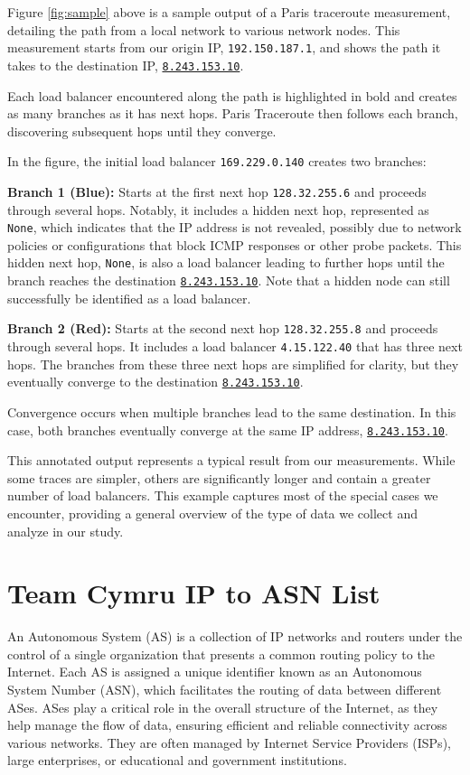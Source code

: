 \documentclass[12pt]{cwru_thesis}
\begin{document}
Figure \ref{fig:sample} above is a sample output of a Paris traceroute measurement, detailing the path from a local network to various network nodes. This measurement starts from our origin IP, \texttt{192.150.187.1}, and shows the path it takes to the destination IP, \underline{\texttt{8.243.153.10}}.

Each load balancer encountered along the path is highlighted in bold and creates as many branches as it has next hops. Paris Traceroute then follows each branch, discovering subsequent hops until they converge.

In the figure, the initial load balancer \texttt{169.229.0.140} creates two branches:

\textbf{Branch 1 (Blue):} Starts at the first next hop \texttt{128.32.255.6} and proceeds through several hops. Notably, it includes a hidden next hop, represented as \texttt{None}, which indicates that the IP address is not revealed, possibly due to network policies or configurations that block ICMP responses or other probe packets. This hidden next hop, \texttt{None}, is also a load balancer leading to further hops until the branch reaches the destination \underline{\texttt{8.243.153.10}}. Note that a hidden node can still successfully be identified as a load balancer.

\textbf{Branch 2 (Red):} Starts at the second next hop \texttt{128.32.255.8} and proceeds through several hops. It includes a load balancer \texttt{4.15.122.40} that has three next hops. The branches from these three next hops are simplified for clarity, but they eventually converge to the destination \underline{\texttt{8.243.153.10}}.

Convergence occurs when multiple branches lead to the same destination. In this case, both branches eventually converge at the same IP address, \underline{\texttt{8.243.153.10}}. 

This annotated output represents a typical result from our measurements. While some traces are simpler, others are significantly longer and contain a greater number of load balancers. This example captures most of the special cases we encounter, providing a general overview of the type of data we collect and analyze in our study.
\newpage


\section{Team Cymru IP to ASN List}

An Autonomous System (AS) is a collection of IP networks and routers under the control of a single organization that presents a common routing policy to the Internet. Each AS is assigned a unique identifier known as an Autonomous System Number (ASN), which facilitates the routing of data between different ASes. ASes play a critical role in the overall structure of the Internet, as they help manage the flow of data, ensuring efficient and reliable connectivity across various networks. They are often managed by Internet Service Providers (ISPs), large enterprises, or educational and government institutions.
\end{document}
